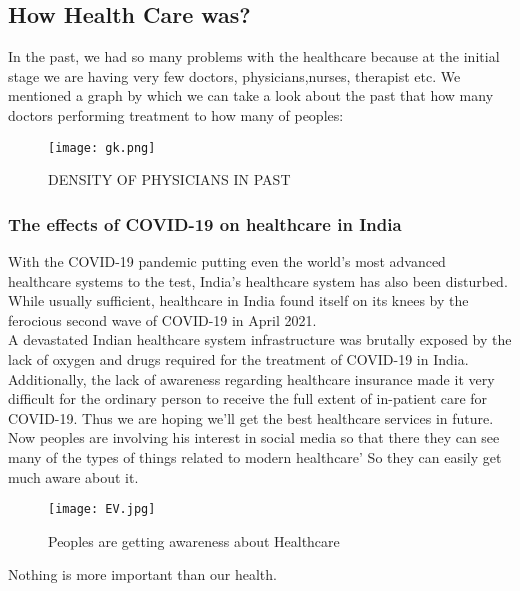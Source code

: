 \documentclass[12pts]{article}
\begin{document}
\subsection*{ How Health Care was? }

In the past, we had so many problems with the healthcare because at the initial stage we are having very few doctors, physicians,nurses, therapist etc.
We mentioned a graph by which we can take a look about the past that how many doctors performing treatment to how many of peoples:\\
\begin{figure}[h]
\centering
\texttt{[image: gk.png]}
\caption{DENSITY OF PHYSICIANS IN PAST}
\end{figure}
\clearpage

\subsubsection*{The effects of COVID-19 on healthcare in India} 
With the COVID-19 pandemic putting even the world’s most advanced healthcare systems to the test, India’s healthcare system has also been disturbed. While usually sufficient, healthcare in India found itself on its knees by the ferocious second wave of COVID-19 in April 2021. \\

A devastated Indian healthcare system infrastructure was brutally exposed by the lack of oxygen and drugs required for the treatment of COVID-19 in India. Additionally, the lack of awareness regarding healthcare insurance made it very difficult for the ordinary person to receive the full extent of in-patient care for COVID-19.
Thus we are hoping we'll get the best healthcare services in future.
Now peoples are involving his interest in social media so that there they can see many of the types of things related to modern healthcare' So they can easily get much aware about it.


\begin{figure}[h]
\centering
\texttt{[image: EV.jpg]}
\caption{Peoples are getting awareness about Healthcare}
\end{figure}



\begin{LARGE}
Nothing is more important than our health. 
\end{LARGE}
\end{document}
